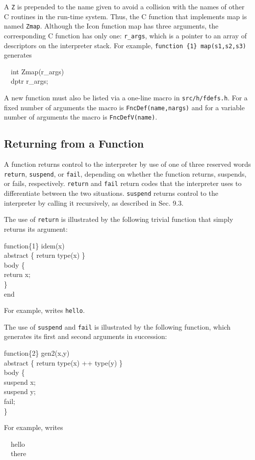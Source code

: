 A \texttt{Z} is prepended to the name given to avoid a collision with the
names of other C routines in the run-time system.  Thus, the C function
that implements map is named \texttt{Zmap}. Although the Icon function map
has three arguments, the corresponding C function has only one:
\texttt{r\_args}, which is a pointer to an array of descriptors on the
interpreter stack.  For example, \texttt{function \{1\} map(s1,s2,s3)} generates
\goodbreak
\begin{iconcode}
\ \ int Zmap(r\_args)\\
\ \ dptr r\_args;
\end{iconcode}
\noindent

A new function must also be listed via a one-line macro in
\texttt{src/h/fdefs.h}. For a fixed number of arguments the macro is
\texttt{FncDef(name,nargs)} and for a variable number of arguments
the macro is \texttt{FncDefV(name)}.

\subsection{Returning from a Function}

A function returns control to the interpreter by use of one of three
reserved words
\texttt{return}, \texttt{suspend}, or \texttt{fail}, depending on whether the
function returns, suspends, or fails, respectively. \texttt{return} and
\texttt{fail} return codes that the interpreter uses to differentiate between
the two situations. \texttt{suspend} returns control to the interpreter by
calling it recursively, as described in Sec. 9.3.

The use of \texttt{return} is illustrated by the following trivial function
that simply returns its argument:
\goodbreak
\begin{iconcode}
function\{1\} idem(x)\\
abstract \{ return type(x) \} \\
body \{\\
\>return x;\\
\> \} \\
end
\end{iconcode}
\noindent
For example,
\noindent writes \texttt{hello}.

The use of \texttt{suspend} and \texttt{fail} is illustrated by the
following function, which generates its first and second arguments in
succession:
\goodbreak
\begin{iconcode}
function\{2\} gen2(x,y)\\
abstract \{ return type(x) ++ type(y) \} \\
body \{\\
\>suspend x;\\
\>suspend y;\\
\>fail;\\
\}
\end{iconcode}
\noindent
For example,
\noindent
writes
\goodbreak
\begin{iconcode}
\ \ hello\\
\ \ there
\end{iconcode}

